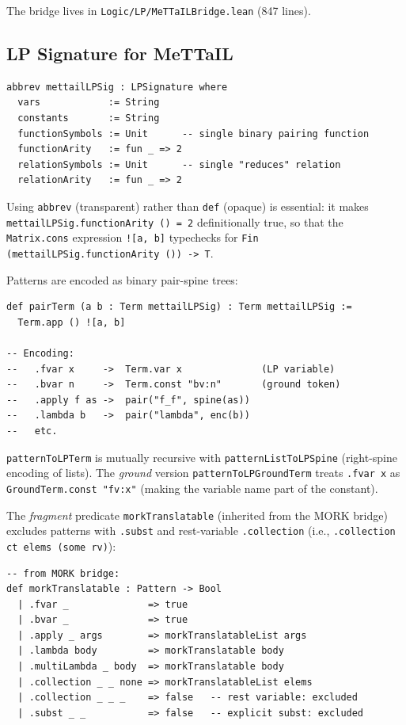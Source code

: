 \documentclass[]{article}
\newcommand{\code}[1]{\texttt{#1}}
\newcommand{\MeTTaIL}{\textup{MeTTaIL}}
\begin{document}
The bridge lives in \code{Logic/LP/MeTTaILBridge.lean} (847 lines).

\subsection{LP Signature for \MeTTaIL{}}

\begin{lstlisting}[language=lean]
abbrev mettailLPSig : LPSignature where
  vars            := String
  constants       := String
  functionSymbols := Unit      -- single binary pairing function
  functionArity   := fun _ => 2
  relationSymbols := Unit      -- single "reduces" relation
  relationArity   := fun _ => 2
\end{lstlisting}

Using \code{abbrev} (transparent) rather than \code{def} (opaque) is essential:
it makes \code{mettailLPSig.functionArity () = 2} definitionally true, so that
the \code{Matrix.cons} expression \code{![a, b]} typechecks for
\code{Fin (mettailLPSig.functionArity ()) -> T}.

Patterns are encoded as binary pair-spine trees:

\begin{lstlisting}[language=lean]
def pairTerm (a b : Term mettailLPSig) : Term mettailLPSig :=
  Term.app () ![a, b]

-- Encoding:
--   .fvar x     ->  Term.var x              (LP variable)
--   .bvar n     ->  Term.const "bv:n"       (ground token)
--   .apply f as ->  pair("f_f", spine(as))
--   .lambda b   ->  pair("lambda", enc(b))
--   etc.
\end{lstlisting}

\code{patternToLPTerm} is mutually recursive with \code{patternListToLPSpine}
(right-spine encoding of lists).  The \emph{ground} version
\code{patternToLPGroundTerm} treats \code{.fvar x} as \code{GroundTerm.const "fv:x"}
(making the variable name part of the constant).

The \emph{fragment} predicate \code{morkTranslatable} (inherited from the MORK
bridge) excludes patterns with \code{.subst} and rest-variable
\code{.collection} (i.e., \code{.collection ct elems (some rv)}):

\begin{lstlisting}[language=lean]
-- from MORK bridge:
def morkTranslatable : Pattern -> Bool
  | .fvar _              => true
  | .bvar _              => true
  | .apply _ args        => morkTranslatableList args
  | .lambda body         => morkTranslatable body
  | .multiLambda _ body  => morkTranslatable body
  | .collection _ _ none => morkTranslatableList elems
  | .collection _ _ _    => false   -- rest variable: excluded
  | .subst _ _           => false   -- explicit subst: excluded
\end{lstlisting}
\end{document}
